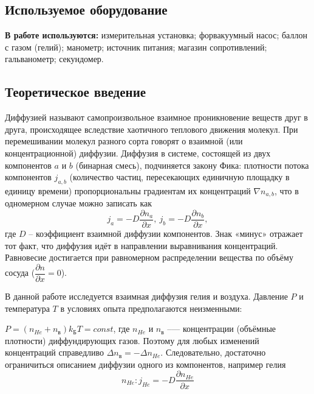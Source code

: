 \documentclass[a4paper,11.5pt]{article} %
\begin{document}
\subsection{Используемое оборудование}

\textbf{В работе используются:} измерительная установка; форвакуумный насос; баллон с газом (гелий); манометр; источник питания;
магазин сопротивлений; гальванометр; секундомер.

\subsection{Теоретическое введение}

Диффузией называют самопроизвольное взаимное проникновение веществ друг в друга, происходящее вследствие хаотичного теплового движения молекул. При перемешивании молекул разного сорта говорят о взаимной (или концентрационной) диффузии. Диффузия в системе, состоящей из двух компонентов $a$ и $b$ (бинарная смесь), подчиняется закону Фика: плотности потока компонентов $j_{a, b}$ (количество частиц, пересекающих единичную площадку в единицу времени) пропорциональны градиентам их концентраций $\nabla n_{a, b}$, что в одномерном случае можно записать как 
\begin{equation}
	j_a = -D \dfrac{\partial n_a}{\partial x},~j_b = -D \dfrac{\partial n_b}{\partial x},
\end{equation}
где $D$ -- коэффициент взаимной диффузии компонентов. Знак «минус» отражает тот факт, что диффузия идёт в направлении выравнивания концентраций. Равновесие достигается при равномерном распределении вещества по объёму сосуда ($\dfrac{\partial n}{\partial x} = 0$).

В данной работе исследуется взаимная диффузия гелия и воздуха. Давление $P$ и температура $T$ в условиях опыта предполагаются неизменными: 

$P = (n_{He} + n_{\text{в}}) k_{\text{Б}} T = const$, где $n_{He}$ и $n_{\text{в}}$ --— концентрации (объёмные плотности) диффундирующих газов. Поэтому для любых изменений концентраций справедливо $\Delta n_{\text{в}} = - \Delta n_{He}$. Следовательно, достаточно ограничиться описанием диффузии одного из компонентов, например гелия 
\begin{equation}
	n_{He}:j_{He} = -D \dfrac{\partial n_{He}}{\partial x}
\end{equation}
\end{document}
